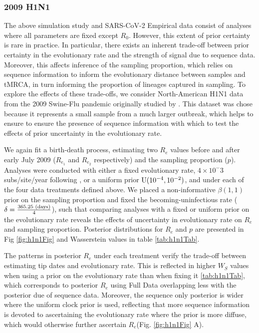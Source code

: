 \documentclass{article}
\begin{document}
\subsubsection*{2009 H1N1}
The above simulation study and SARS-CoV-2 Empirical data consist of analyses where all parameters are fixed except $R_0$. However, this extent of prior certainty is rare in practice. In particular, there exists an inherent trade-off between prior certainty in the evolutionary rate and the strength of signal due to sequence data. Moreover, this affects inference of the sampling proportion, which relies on sequence information to inform the evolutionary distance between samples and tMRCA, in turn informing the proportion of lineages captured in sampling. To explore the effects of these trade-offs, we consider North-American H1N1 data from the 2009 Swine-Flu pandemic originally studied by \citet{hedge_2013_real-time}. This dataset was chose because it represents a small sample from a much larger outbreak, which helps to ensure to ensure the presence of sequence information with which to test the effects of prior uncertainty in the evolutionary rate.

We again fit a birth-death process, estimating two $R_e$ values before and after early July 2009 ($R_{e_1}$ and $R_{e_2}$ respectively) and the sampling proportion ($p$). Analyses were conducted with either a fixed evolutionary rate, $4\times10^-3$ subs/site/year following \citet{hedge_2013_real-time}, or a uniform prior $\textnormal{U}(10^{-4}, 10^{-2})$, and under each of the four data treatments defined above. We placed a non-informative $\beta(1,1)$ prior on the sampling proportion and fixed the becoming-uninfectious rate ($\delta=\frac{365.25\textnormal{ (days)}}{4}$), such that comparing analyses with a fixed or uniform prior on the evolutionary rate reveals the effects of uncertainty in evolutionary rate on $R_e$ and sampling proportion. Posterior distributions for $R_e$ and $p$ are presented in Fig \ref{fig:h1n1Fig} and Wasserstein values in table \ref{tab:h1n1Tab}.

The patterns in posterior $R_e$ under each treatment verify the trade-off between estimating tip dates and evolutionary rate. This is reflected in higher $W_S$ values when using a prior on the evolutionary rate than when fixing it \ref{tab:h1n1Tab}, which corresponds to posterior $R_e$ using Full Data overlapping less with the posterior due of sequence data. Moreover, the sequence only posterior is wider where the uniform clock prior is used, reflecting that more sequence information is devoted to ascertaining the evolutionary rate where the prior is more diffuse, which would otherwise further ascertain $R_e$(Fig. \ref{fig:h1n1Fig} A).
\end{document}
